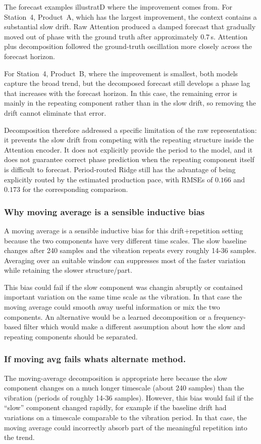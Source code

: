 \documentclass[a4, 12pt]{article}
\begin{document}
The forecast examples illustratD where the improvement comes from. For
Station~4, Product~A, which has the largest improvement, the context
contains a substantial slow drift. Raw Attention produced a damped forecast
that gradually moved out of phase with the ground truth after approximately
$0.7$\,s. Attention plus decomposition followed the ground-truth oscillation
more closely across the forecast horizon.

For Station~4, Product~B, where the improvement is smallest, both models
capture the broad trend, but the decomposed forecast still develops a phase
lag that increases with the forecast horizon. In this case, the remaining
error is mainly in the repeating component rather than in the slow drift,
so removing the drift cannot eliminate that error.

Decomposition therefore addressed a specific limitation of the raw
representation: it prevents the slow drift from competing with the
repeating structure inside the Attention encoder. It does not explicitly
provide the period to the model, and it does not guarantee correct phase
prediction when the repeating component itself is difficult to forecast.
Period-routed Ridge still has the advantage of being explicitly routed by
the estimated production pace, with RMSEs of $0.166$ and $0.173$ for the
corresponding comparison.

\subsubsection{Why moving average is a sensible inductive bias}

A moving average is a sensible inductive bias for this
drift+repetition setting because the two components have very
different time scales. The slow baseline changes after
240 samples and the vibration repeats every roughly 14-36 samples.
Averaging over an suitable window can suppresses most of the
faster variation while retaining the slower structure/part.

This bias could fail if the slow component was changin abruptly or contained
important variation on the same time scale as the vibration. In that case
the moving average could smooth away useful information or mix the two
components. An alternative would be a learned decomposition or a
frequency-based filter which would make a different assumption about how
the slow and repeating components should be separated.

\subsubsection{If moving avg fails whats alternate method.}
The moving-average decomposition is appropriate here because the slow component
changes on a much longer timescale (about 240 samples) than the vibration
(periods of roughly 14-36 samples). However, this bias would fail if the
``slow'' component changed rapidly, for example if the baseline drift had
variations on a timescale comparable to the vibration period. In that case,
the moving average could incorrectly absorb part of the meaningful repetition
into the trend.
\end{document}
